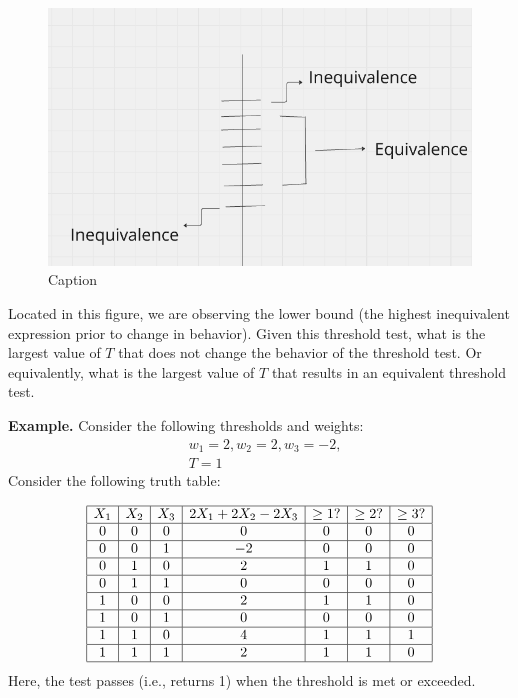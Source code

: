 \documentclass[]{article}
\begin{document}
\begin{figure}
    \centering
    \includegraphics[width=\textwidth]{Screenshot 2024-11-01 at 1.26.08 PM.png}
    \caption{Caption}
    \label{fig:enter-label}
\end{figure}

Located in this figure, we are observing the lower bound (the highest inequivalent expression prior to change in behavior). Given this threshold test, what is the largest value of \(T\) that does not change the behavior of the threshold test.  Or equivalently, what is the largest value of \(T\) that results in an equivalent threshold test.

\textbf{Example.} Consider the following thresholds and weights:
\[
\begin{aligned}
    & w_1 = 2, w_2 = 2, w_3 = -2, \\
    & T = 1
\end{aligned}
\]
Consider the following truth table:

\[
\begin{array}{|c|c|c|c|c|c|c|}
\hline
X_1 & X_2 & X_3 & 2X_1 + 2X_2 - 2X_3 & \ge 1? & \ge 2? & \ge 3? \\
\hline
0 & 0 & 0 & 0 & 0 & 0 & 0 \\ \hline
0 & 0 & 1 & -2 & 0 & 0 & 0 \\ \hline
0 & 1 & 0 & 2 & 1 & 1 & 0 \\ \hline
0 & 1 & 1 & 0 & 0 & 0 & 0 \\ \hline
1 & 0 & 0 & 2 & 1 & 1 & 0 \\ \hline
1 & 0 & 1 & 0 & 0 & 0 & 0 \\ \hline
1 & 1 & 0 & 4 & 1 & 1 & 1 \\ \hline
1 & 1 & 1 & 2 & 1 & 1 & 0 \\
\hline
\end{array}
\]
Here, the test passes (i.e., returns 1) when the threshold is met or exceeded.
\end{document}

